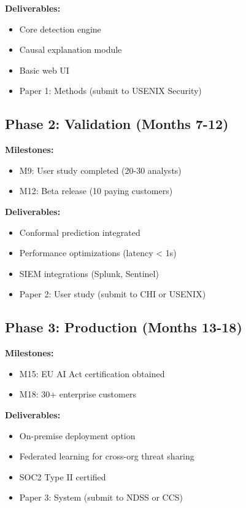\documentclass[conference]{IEEEtran}
\begin{document}
\textbf{Deliverables:}
\begin{itemize}
    \item Core detection engine
    \item Causal explanation module
    \item Basic web UI
    \item Paper 1: Methods (submit to USENIX Security)
\end{itemize}

\subsection{Phase 2: Validation (Months 7-12)}

\textbf{Milestones:}
\begin{itemize}
    \item M9: User study completed (20-30 analysts)
    \item M12: Beta release (10 paying customers)
\end{itemize}

\textbf{Deliverables:}
\begin{itemize}
    \item Conformal prediction integrated
    \item Performance optimizations (latency < 1s)
    \item SIEM integrations (Splunk, Sentinel)
    \item Paper 2: User study (submit to CHI or USENIX)
\end{itemize}

\subsection{Phase 3: Production (Months 13-18)}

\textbf{Milestones:}
\begin{itemize}
    \item M15: EU AI Act certification obtained
    \item M18: 30+ enterprise customers
\end{itemize}

\textbf{Deliverables:}
\begin{itemize}
    \item On-premise deployment option
    \item Federated learning for cross-org threat sharing
    \item SOC2 Type II certified
    \item Paper 3: System (submit to NDSS or CCS)
\end{itemize}
\end{document}
